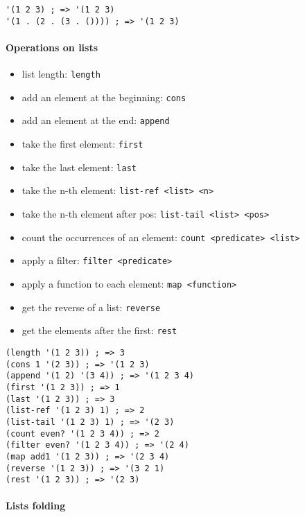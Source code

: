 \documentclass[a4paper,landscape,10pt]{article}
\begin{document}
\begin{multicols*}{2}
  \begin{lstlisting}[language=Racket]
'(1 2 3) ; => '(1 2 3)
'(1 . (2 . (3 . ()))) ; => '(1 2 3)
\end{lstlisting}

  \paragraph{Operations on lists}

  \begin{itemize}
    \item list length: \texttt{length}
    \item add an element at the beginning: \texttt{cons}
    \item add an element at the end: \texttt{append}
    \item take the first element: \texttt{first}
    \item take the last element: \texttt{last}
    \item take the n-th element: \texttt{list-ref <list> <n>}
    \item take the n-th element after pos: \texttt{list-tail <list> <pos>}
    \item count the occurrences of an element: \texttt{count <predicate> <list>}
    \item apply a filter: \texttt{filter <predicate>}
    \item apply a function to each element: \texttt{map <function>}
    \item get the reverse of a list: \texttt{reverse}
    \item get the elements after the first: \texttt{rest}
  \end{itemize}

  \begin{lstlisting}[language=Racket]
(length '(1 2 3)) ; => 3
(cons 1 '(2 3)) ; => '(1 2 3)
(append '(1 2) '(3 4)) ; => '(1 2 3 4)
(first '(1 2 3)) ; => 1
(last '(1 2 3)) ; => 3
(list-ref '(1 2 3) 1) ; => 2
(list-tail '(1 2 3) 1) ; => '(2 3)
(count even? '(1 2 3 4)) ; => 2
(filter even? '(1 2 3 4)) ; => '(2 4)
(map add1 '(1 2 3)) ; => '(2 3 4)
(reverse '(1 2 3)) ; => '(3 2 1)
(rest '(1 2 3)) ; => '(2 3)
\end{lstlisting}

  \vfill

  \paragraph{Lists folding}


\end{multicols*}
\end{document}
